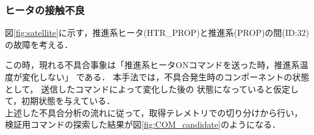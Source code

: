 \documentclass[11pt]{jsarticle}%
\begin{document}
\begin{multicols}{2}
  \subsubsection{ヒータの接触不良}
図\ref{fig:satellite}に示す，推進系ヒータ(HTR\_PROP)と推進系(PROP)の間(ID:32)
の故障を考える．

この時，現れる不具合事象は「推進系ヒータONコマンドを送った時，推進系温度が変化しない」
である．
本手法では，不具合発生時のコンポーネントの状態として，
送信したコマンドによって変化した後の
状態になっていると仮定して，初期状態を与えている．\\
上述した不具合分析の流れに従って，取得テレメトリでの切り分けから行い，
検証用コマンドの探索した結果が図\ref{fig:COM_candidate}のようになる．

\end{multicols}
\end{document}
